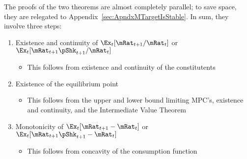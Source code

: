 \documentclass[BufferStockTheory]{subfiles}
\begin{document}
The proofs of the two theorems are almost completely parallel; to save space, they are relegated to Appendix~\ref{sec:ApndxMTargetIsStable}.  In sum, they involve three steps:

\begin{enumerate}
\item Existence and continuity of $\Ex_{t}[\mRat_{t+1}/\mRat_{t}]$ or $\Ex_{t}[\mRat_{t+1}\pShk_{t+1}/\mRat_{t}]$
  \begin{itemize}
    \item This follows from existence and continuity of the constitutents
    \end{itemize}
  \item Existence of the equilibrium point
    \begin{itemize}
    \item This follows from the upper and lower bound limiting MPC's, existence and continuity, and the Intermediate Value Theorem
    \end{itemize}
  \item Monotonicity of $\Ex_{t}[{\mRat}_{t+1}-\mRat_{t}]$ or $\Ex_{t}[{\mRat}_{t+1}\pShk_{t+1}-\mRat_{t}]$
    \begin{itemize}
    \item This follows from concavity of the consumption function
    \end{itemize}
\end{enumerate}



\end{document}
